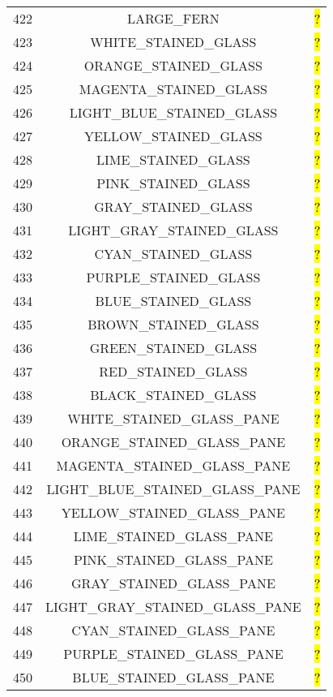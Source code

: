 \documentclass[11pt]{article}
\newcommand\myworries[1]{\sethlcolor{red}\hl{#1}}
\begin{document}
\begin{longtable}{ |c|c|c| }
422 & LARGE\_FERN & \myworries{?} \\
423 & WHITE\_STAINED\_GLASS & \myworries{?} \\
424 & ORANGE\_STAINED\_GLASS & \myworries{?} \\
425 & MAGENTA\_STAINED\_GLASS & \myworries{?} \\
426 & LIGHT\_BLUE\_STAINED\_GLASS & \myworries{?} \\
427 & YELLOW\_STAINED\_GLASS & \myworries{?} \\
428 & LIME\_STAINED\_GLASS & \myworries{?} \\
429 & PINK\_STAINED\_GLASS & \myworries{?} \\
430 & GRAY\_STAINED\_GLASS & \myworries{?} \\
431 & LIGHT\_GRAY\_STAINED\_GLASS & \myworries{?} \\
432 & CYAN\_STAINED\_GLASS & \myworries{?} \\
433 & PURPLE\_STAINED\_GLASS & \myworries{?} \\
434 & BLUE\_STAINED\_GLASS & \myworries{?} \\
435 & BROWN\_STAINED\_GLASS & \myworries{?} \\
436 & GREEN\_STAINED\_GLASS & \myworries{?} \\
437 & RED\_STAINED\_GLASS & \myworries{?} \\
438 & BLACK\_STAINED\_GLASS & \myworries{?} \\
439 & WHITE\_STAINED\_GLASS\_PANE & \myworries{?} \\
440 & ORANGE\_STAINED\_GLASS\_PANE & \myworries{?} \\
441 & MAGENTA\_STAINED\_GLASS\_PANE & \myworries{?} \\
442 & LIGHT\_BLUE\_STAINED\_GLASS\_PANE & \myworries{?} \\
443 & YELLOW\_STAINED\_GLASS\_PANE & \myworries{?} \\
444 & LIME\_STAINED\_GLASS\_PANE & \myworries{?} \\
445 & PINK\_STAINED\_GLASS\_PANE & \myworries{?} \\
446 & GRAY\_STAINED\_GLASS\_PANE & \myworries{?} \\
447 & LIGHT\_GRAY\_STAINED\_GLASS\_PANE & \myworries{?} \\
448 & CYAN\_STAINED\_GLASS\_PANE & \myworries{?} \\
449 & PURPLE\_STAINED\_GLASS\_PANE & \myworries{?} \\
450 & BLUE\_STAINED\_GLASS\_PANE & \myworries{?} \\

\end{longtable}
\end{document}
